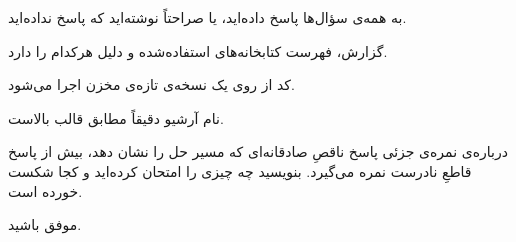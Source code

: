 \begin{checklist}
    \citem به همه‌ی سؤال‌ها پاسخ داده‌اید، یا صراحتاً نوشته‌اید که پاسخ نداده‌اید.
    \item گزارش، فهرست کتابخانه‌های استفاده‌شده و دلیل هرکدام را دارد.
    \item کد از روی یک نسخه‌ی تازه‌ی مخزن اجرا می‌شود.
    \item نام آرشیو دقیقاً مطابق قالب بالاست.
\end{checklist}

\begin{asidebox}{درباره‌ی نمره‌ی جزئی}
    پاسخ ناقصِ صادقانه‌ای که مسیر حل را نشان دهد، بیش از پاسخ قاطعِ نادرست
    نمره می‌گیرد. بنویسید چه چیزی را امتحان کرده‌اید و کجا شکست خورده است.
\end{asidebox}

موفق باشید.
